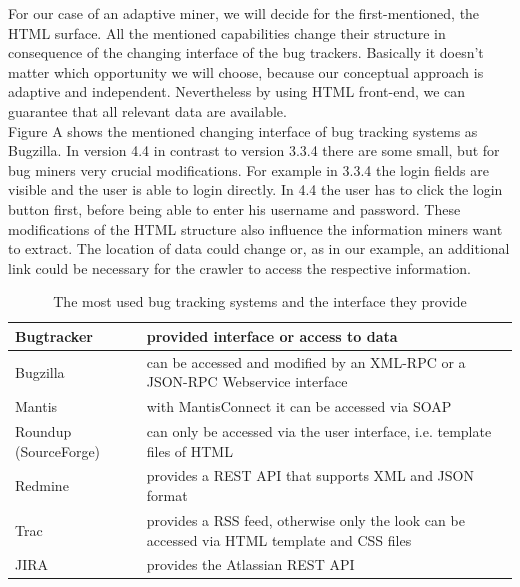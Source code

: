  For our case of an adaptive miner, we will decide for the first-mentioned, the HTML surface. All the mentioned capabilities change their  structure in consequence of the changing interface of the bug trackers.  Basically it doesn't matter which opportunity we will choose, because our conceptual approach is adaptive and independent. Nevertheless by using HTML front-end, we can guarantee that all relevant data are available.\\ Figure A shows the mentioned changing interface of bug tracking systems as Bugzilla. In version 4.4 in contrast to version 3.3.4 there are some small, but for bug miners very crucial modifications. For example in 3.3.4 the login fields are visible and the user is able to login directly. In 4.4 the user has to click the login button first, before being able to enter his username and password. These modifications of the HTML structure also influence the information miners want to extract. The location of data could change or, as in our example, an additional link could be necessary for the crawler to access the respective information.
\begin{table}
\centering
\begin{tabular}{|p{3cm}|p{10.5cm}|}
	\hline
	\textbf{Bugtracker} & \textbf{provided interface or access to data}  \\
	\hline
	\hline
	Bugzilla & can be accessed and modified by an XML-RPC or a JSON-RPC 	     Webservice interface \\
	\hline
	Mantis & with MantisConnect it can be accessed via SOAP \\
	\hline
	Roundup (SourceForge) & can only be accessed via the user interface, i.e. template files of HTML\\
	\hline
	Redmine & provides a REST API that supports XML and JSON format \\
	\hline
	Trac & provides a RSS feed, otherwise only the look can be accessed via HTML template and CSS files \\
	\hline
	JIRA & provides the Atlassian REST API \\
	\hline
\end{tabular}
\caption{The most used bug tracking systems and the interface they provide}
\label{tabelle interface}
\end{table} 

